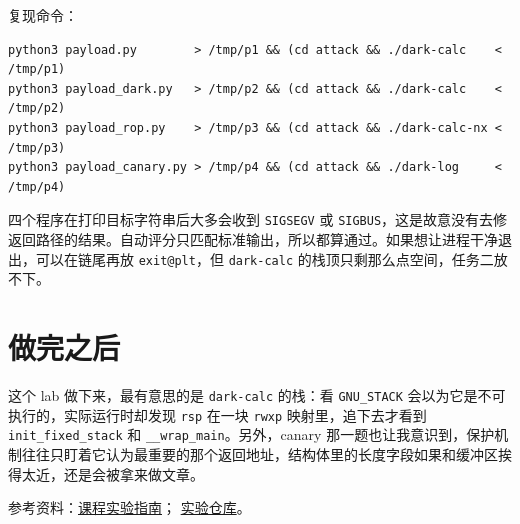 \documentclass[UTF8,11pt,fontset=fandol]{ctexart}
\newcommand{\code}[1]{\texttt{#1}}
\begin{document}
\pagebreak[3]
复现命令：

\begin{lstlisting}
python3 payload.py        > /tmp/p1 && (cd attack && ./dark-calc    < /tmp/p1)
python3 payload_dark.py   > /tmp/p2 && (cd attack && ./dark-calc    < /tmp/p2)
python3 payload_rop.py    > /tmp/p3 && (cd attack && ./dark-calc-nx < /tmp/p3)
python3 payload_canary.py > /tmp/p4 && (cd attack && ./dark-log     < /tmp/p4)
\end{lstlisting}

四个程序在打印目标字符串后大多会收到 \code{SIGSEGV} 或 \code{SIGBUS}，这是故意没有去修返回路径的结果。自动评分只匹配标准输出，所以都算通过。如果想让进程干净退出，可以在链尾再放 \code{exit@plt}，但 \code{dark-calc} 的栈顶只剩那么点空间，任务二放不下。

\section{做完之后}

这个 lab 做下来，最有意思的是 \code{dark-calc} 的栈：看 \code{GNU\_STACK} 会以为它是不可执行的，实际运行时却发现 \code{rsp} 在一块 \code{rwxp} 映射里，追下去才看到 \code{init\_fixed\_stack} 和 \code{\_\_wrap\_main}。另外，canary 那一题也让我意识到，保护机制往往只盯着它认为最重要的那个返回地址，结构体里的长度字段如果和缓冲区挨得太近，还是会被拿来做文章。

\vspace{4pt}
\noindent\small
参考资料：\href{https://ics-26fall-fdu.github.io/labs/lab3-attack-lab/}{课程实验指南}；
\href{https://github.com/jackeylilw-lab/lab3-attacklab}{实验仓库}。
\end{document}
